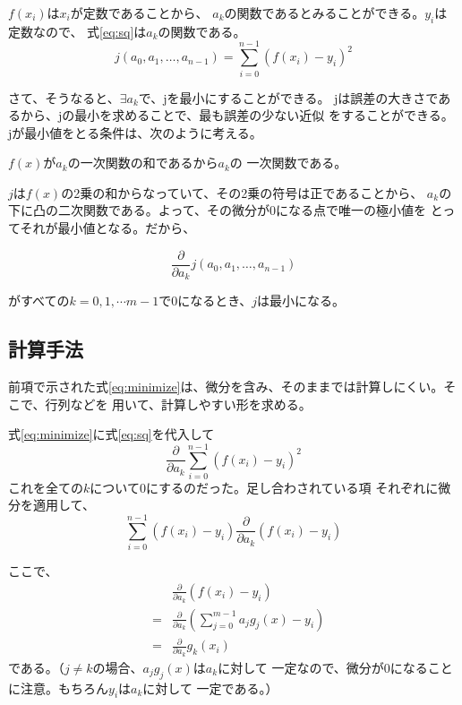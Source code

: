 \documentclass{jsarticle}
\begin{document}
\(f(x_i)\)は\(x_i\)が定数であることから、
\(a_k\)の関数であるとみることができる。\(y_i\)は定数なので、
式\ref{eq:sq}は\(a_k\)の関数である。
\[
    j(a_0,a_1,\ldots,a_{n-1})=\sum^{n-1}_{i=0} ( f(x_i)-y_{i} )^2
\]

さて、そうなると、\(\exists a_k\)で、jを最小にすることができる。
jは誤差の大きさであるから、jの最小を求めることで、最も誤差の少ない近似
をすることができる。
jが最小値をとる条件は、次のように考える。

\(f(x)\)が\(a_k\)の一次関数の和であるから\(a_k\)の
一次関数である。

\(j\)は\(f(x)\)の2乗の和からなっていて、その2乗の符号は正であることから、
\(a_k\)の下に凸の二次関数である。よって、その微分が0になる点で唯一の極小値を
とってそれが最小値となる。だから、

\begin{equation}
    \frac{\partial }{\partial a_k}j(a_0,a_1,\ldots,a_{n-1})
    \label{eq:minimize}
\end{equation}

がすべての\(k=0,1,\cdots m-1\)で0になるとき、\(j\)は最小になる。
\subsection{計算手法}
前項で示された式\ref{eq:minimize}は、微分を含み、そのままでは計算しにくい。そこで、行列などを
用いて、計算しやすい形を求める。

式\ref{eq:minimize}に式\ref{eq:sq}を代入して
\begin{equation}
    \frac{\partial }{\partial a_k}\sum^{n-1}_{i=0} ( f(x_i)-y_{i} )^2
\end{equation}
これを全ての\(k\)について0にするのだった。足し合わされている項
それぞれに微分を適用して、
\begin{equation}
    \sum^{n-1}_{i=0}( f(x_i)-y_i ) \frac{\partial }{\partial a_k}( f(x_i)-y_i )
\end{equation}

ここで、
\begin{eqnarray}
    &&\frac{\partial }{\partial a_k}( f(x_i)-y_i )\label{eq:seirimael}\nonumber \\ &=&
    \frac{\partial }{\partial a_k}(\sum^{m-1}_{j=0} a_j g_j(x) - y_i )\nonumber\\ &=&
    \frac{\partial }{\partial a_k}g_k(x_i)\label{eq:seirimaer}
\end{eqnarray}
である。（\(j\neq k\)の場合、\(a_jg_j(x)\)は\(a_k\)に対して
一定なので、微分が0になることに注意。もちろん\(y_i\)は\(a_k\)に対して
一定である。）
\end{document}
